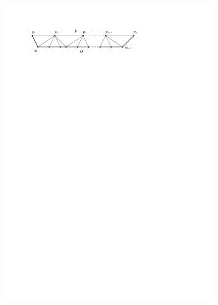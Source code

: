     \begin{figure}[h]
      \centering
      \includegraphics[scale=1]{unifiedAlgo/img/rightNeighbourwalk/neighborPath.pdf}
      \caption{}
      \label{fig:right:neighborPath}
    \end{figure}


